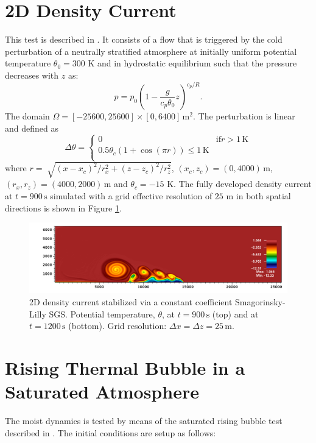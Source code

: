 \documentclass{report}
\begin{document}
\section{2D Density Current}
This test is described in \cite{strakaWilhelmson1993}. It consists of a flow that is triggered by the cold perturbation of a neutrally stratified atmosphere at initially uniform potential temperature $\theta_0 = 300$ K
and in hydrostatic equilibrium such that the pressure decreases with $z$ as:
\begin{equation}
\label{pressureDistrib2}
p = p_{0}\left(1-\frac{g}{c_p{\theta_{0}}}z\right)^{c_p/R}.
\end{equation}
The domain $\Omega=[-25600,25600]\times[0,6400]\,\mathrm{m}^2$.
The perturbation is linear and defined as
\begin{equation}
 \Delta\theta = \left\{ \begin{array}{ll}
 0 & \mathrm{if } r > 1\,{\mathrm K}\\
 0.5 \theta_c \left(1 + \cos(\pi r) \right) \leq 1\,{\mathrm K}\\
\end{array} \right.
\label{eq:robertIni2}
\end{equation}
where $r = \sqrt[]{(x-x_{c})^2/r_x^{2} + (z-z_{c})^{2}/r_z^2}$, $(x_c,z_c) = (0,4000)\,\mathrm{m}$, $(r_x, r_z) = (4000, 2000)\,\mathrm{m}$ and $\theta_c=-15$ K. The fully developed density current at $t=900\,\mathrm{s}$ simulated with a grid effective resolution of $25$ m in both spatial directions is shown in Figure \ref{fig:benchmarks/dc25msmago}.

\begin{figure}[htbp]
\includegraphics[width=1.2\textwidth]{figures/DC-smgo-25mx25m-900s0000.png}
\caption{2D density current stabilized via a constant coefficient Smagorinsky-Lilly SGS. Potential temperature, $\theta$, at $t=900\,\mathrm{s}$ (top) and at $t=1200\,\mathrm{s}$ (bottom). Grid resolution: $\Delta x = \Delta z = 25\,\mathrm{m}$.
}
\label{fig:benchmarks/dc25msmago}
\end{figure}


\section{Rising Thermal Bubble in a Saturated Atmosphere}
\label{rtb3D}
The moist dynamics is tested by means of the saturated rising bubble test described in \cite{Pressel15a}. The initial conditions are setup as follows:
\end{document}
